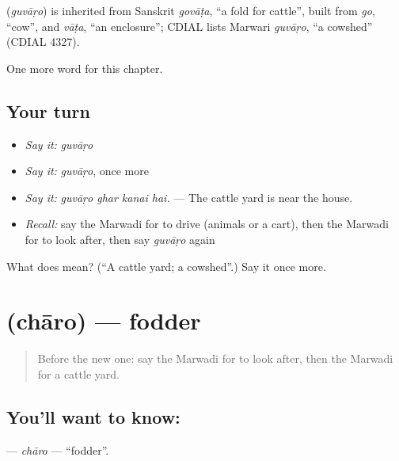 \begin{cousinweb}
\textbf{} (\emph{guvāṛo}) is inherited from Sanskrit \emph{govāṭa}, \textquotedblleft{}a fold for cattle\textquotedblright{}, built from \emph{go}, \textquotedblleft{}cow\textquotedblright{}, and \emph{vāṭa}, \textquotedblleft{}an enclosure\textquotedblright{}; CDIAL lists Marwari \emph{guvāṛo}, \textquotedblleft{}a cowshed\textquotedblright{} (CDIAL 4327).
\end{cousinweb}

\begin{grammarlens}[title={What you've built}]
One more word for this chapter.
\end{grammarlens}

\subsection*{Your turn}
\begin{itemize}
\raggedright
  \item \emph{Say it:} \emph{guvāṛo}
  \item \emph{Say it:} \emph{guvāṛo}, once more
  \item \emph{Say it:} \emph{guvāṛo ghar kanai hai.} — The cattle yard is near the house.
  \item \emph{Recall:} say the Marwadi for to drive (animals or a cart), then the Marwadi for to look after, then say \emph{guvāṛo} again
\end{itemize}

\begin{tcolorbox}[breakable,colback=teal!4,colframe=teal!35!black,title={Before you move on}]
What does  mean? (\textquotedblleft{}A cattle yard; a cowshed\textquotedblright{}.) Say it once more.
\end{tcolorbox}
\section[\texorpdfstring{\mw{चारो} (chāro)}{चारो (chāro)}]{ (chāro) — fodder}

\label{lesson:MW-C235-charo}



\begin{quote}
Before the new one: say the Marwadi for to look after, then the Marwadi for a cattle yard.
\end{quote}

\subsection*{You'll want to know: }
\textbf{} — \emph{chāro} — \textquotedblleft{}fodder\textquotedblright{}.

